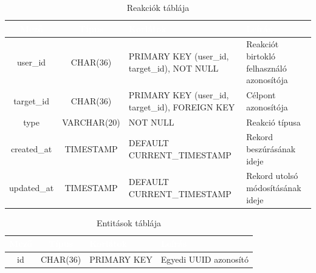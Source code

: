 \documentclass[12pt]{report}
\begin{document}
\begin{table}[h!]
    \centering
    \renewcommand{\arraystretch}{1.5}  %
    \begin{tabularx}{\textwidth}{|c|c|>{\raggedright\arraybackslash}X|>{\raggedright\arraybackslash}X|}  %
        \hline
        \rowcolor{gray!30} \textcolor{white}{\textbf{Mező}} & \textcolor{white}{\textbf{Típus}} & \textcolor{white}{\textbf{Korlátok}} & \textcolor{white}{\textbf{Leírás}} \\
        \hline
        user\_id & CHAR(36) & PRIMARY KEY (user\_id, target\_id), NOT NULL & Reakciót birtokló felhasználó azonosítója \\
        \hline
        target\_id & CHAR(36) & PRIMARY KEY (user\_id, target\_id), FOREIGN KEY & Célpont azonosítója \\
        \hline
        type & VARCHAR(20) & NOT NULL & Reakció típusa \\
        \hline
        created\_at & TIMESTAMP & DEFAULT CURRENT\_TIMESTAMP & Rekord beszúrásának ideje \\
        \hline
        updated\_at & TIMESTAMP & DEFAULT CURRENT\_TIMESTAMP & Rekord utolsó módosításának ideje \\
        \hline
    \end{tabularx}
    \caption{Reakciók táblája}
    \label{tab:reactions}
\end{table}

\begin{table}[h!]
    \centering
    \renewcommand{\arraystretch}{1.5}  %
    \begin{tabularx}{\textwidth}{|c|c|>{\raggedright\arraybackslash}X|>{\raggedright\arraybackslash}X|}  %
        \hline
        \rowcolor{gray!30} \textcolor{white}{\textbf{Mező}} & \textcolor{white}{\textbf{Típus}} & \textcolor{white}{\textbf{Korlátok}} & \textcolor{white}{\textbf{Leírás}} \\
        \hline
        id & CHAR(36) & PRIMARY KEY & Egyedi UUID azonosító \\
        \hline
    \end{tabularx}
    \caption{Entitások táblája}
    \label{tab:entities}
\end{table}
\end{document}
